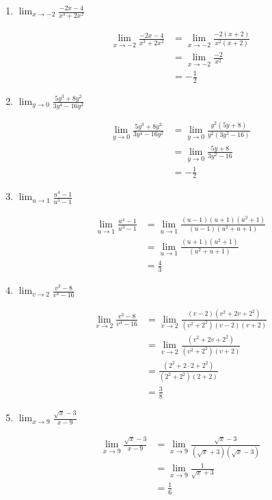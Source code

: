 \documentclass[a4paper, 12pt]{article}
\begin{document}
\begin{enumerate}
    \item $\lim_{x \to -2} \frac{-2x -4}{x^3 + 2x^2}$
    
    \begin{align*}
        \lim_{x \to -2} \frac{-2x -4}{x^3 + 2x^2} &= \lim_{x \to -2} \frac{-2(x+2)}{x^2(x+2)}\\
        &= \lim_{x \to -2} \frac{-2}{x^2}\\
        &= -\frac{1}{2}
    \end{align*}

    \item $\lim_{y \to 0} \frac{5y^3 + 8y^2}{3y^4 - 16y^2}$
    
    \begin{align*}
        \lim_{y \to 0} \frac{5y^3 + 8y^2}{3y^4 - 16y^2} &= \lim_{y \to 0} \frac{y^2(5y + 8)}{y^2(3y^2 - 16)}\\
        &= \lim_{y \to 0} \frac{5y + 8}{3y^2 - 16}\\
        &= -\frac{1}{2}
    \end{align*}

    \item $\lim_{u \to 1} \frac{u^4 - 1}{u^3 - 1}$
    
    \begin{align*}
        \lim_{u \to 1} \frac{u^4 - 1}{u^3 - 1} &= \lim_{u \to 1} \frac{(u-1)(u+1)(u^2 + 1)}{(u-1)(u^2 +u + 1)}\\
        &= \lim_{u \to 1} \frac{(u+1)(u^2 + 1)}{(u^2 +u + 1)} \\
        &= \frac{4}{3}
    \end{align*}

    \item $\lim_{v \to 2} \frac{v^3 - 8}{v^4 - 16}$
    
    \begin{align*}
        \lim_{v \to 2} \frac{v^3 -8}{v^4 - 16} &= \lim_{v \to 2} \frac{(v-2)(v^2 + 2v + 2^2)}{(v^2 + 2^2)(v-2)(v+2)}\\
        &= \lim_{v \to 2} \frac{(v^2 + 2v + 2^2)}{(v^2 + 2^2)(v+2)}\\
        &= \frac{(2^2 + 2\cdot 2 + 2^2)}{(2^2 + 2^2)(2+2)}\\
        &= \frac{3}{8}
    \end{align*}

    \item $\lim_{x \to 9} \frac{\sqrt{x}- 3}{x-9}$
    
    \begin{align*}
        \lim_{x \to 9} \frac{\sqrt{x}- 3}{x-9} &= \lim_{x \to 9} \frac{\sqrt{x}- 3}{(\sqrt{x} + 3)(\sqrt{x}-3)}\\
        &= \lim_{x \to 9} \frac{1}{\sqrt{x}+3}\\
        &= \frac{1}{6}
    \end{align*}


\end{enumerate}
\end{document}

